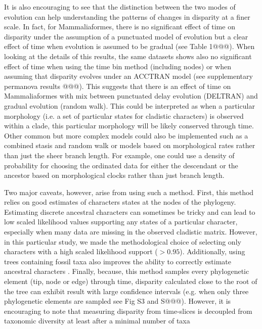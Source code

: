 \documentclass[12pt,letterpaper]{article}
\begin{document}
\begin{enumerate}
    It is also encouraging to see that the distinction between the two modes of evolution can help understanding the patterns of changes in disparity at a finer scale.
    In fact, for Mammaliaformes, there is no significant effect of time on disparity under the assumption of a punctuated model of evolution but a clear effect of time when evolution is assumed to be gradual (see Table 1@@@).
    When looking at the details of this results, the same datasets shows also no significant effect of time when using the time bin method (including nodes) or when assuming that disparity evolves under an ACCTRAN model (see supplementary permanova results @@@).
    This suggests that there is an effect of time on Mammaliaformes with mix between punctuated delay evolution (DELTRAN) and gradual evolution (random walk).
    This could be interpreted as when a particular morphology (i.e. a set of particular states for cladistic characters) is observed within a clade, this particular morphology will be likely conserved through time.
    Other common but more complex models could also be implemented such as a combined stasis and random walk \citep{Hunt21042015} or models based on morphological rates rather than just the sheer branch length.
    For example, one could use a density of probability for choosing the ordinated data for either the descendant or the ancestor based on morphological clocks rather than just branch length.
\end{enumerate}
Two major caveats, however, arise from using such a method.
First, this method relies on good estimates of characters states at the nodes of the phylogeny.
Estimating discrete ancestral characters can sometimes be tricky and can lead to low scaled likelihood values supporting any states of a particular character, especially when many data are missing in the observed cladistic matrix.
However, in this particular study, we made the methodological choice of selecting only characters with a high scaled likelihood support ($> 0.95$).
Additionally, using trees containing fossil taxa also improves the ability to correctly estimate ancestral characters \citep{Poly2001,Finarelli2006,Albert2009,Slater2012MEE}.
Finally, because, this method samples every phylogenetic element (tip, node or edge) through time, disparity calculated close to the root of the tree can exhibit result with large confidence intervals (e.g. when only three phylogenetic elements are sampled see Fig S3 and S@@@).
However, it is encouraging to note that measuring disparity from time-slices is decoupled from taxonomic diversity at least after a minimal number of taxa \citep{slaterCetacean,ruta2013,hopkinsdecoupling2013}
\end{document}
